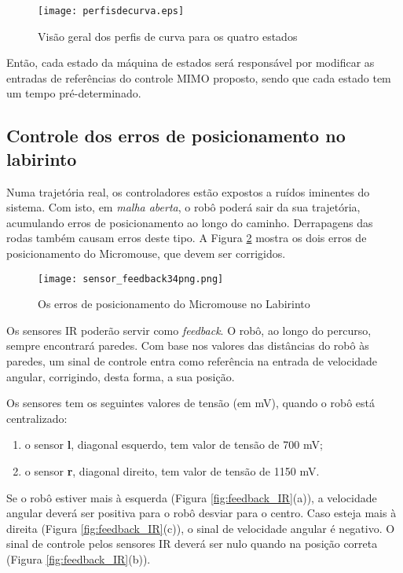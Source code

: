 \begin{figure}[!htb]
	\caption{\label{fig:curvasperfil_4}Visão geral dos perfis de curva para os quatro estados}
	\begin{center}
		\texttt{[image: perfisdecurva.eps]}
	\end{center}
\end{figure} 

Então, cada estado da máquina de estados será responsável por modificar as entradas de referências do controle MIMO proposto, sendo que cada estado tem um tempo pré-determinado. 
\subsection{Controle dos erros de posicionamento no labirinto}
Numa trajetória real, os controladores estão expostos a ruídos iminentes do sistema. Com isto, em \emph{malha aberta}, o robô poderá sair da sua trajetória, acumulando erros de posicionamento ao longo do caminho. Derrapagens das rodas também causam erros deste tipo. A Figura \ref{fig:errosposic} mostra os dois erros de posicionamento do Micromouse, que devem ser corrigidos.

\begin{figure}[!htb]
	\caption{\label{fig:errosposic}Os erros de posicionamento do Micromouse no Labirinto}
	\begin{center}
		\texttt{[image: sensor\_feedback34png.png]}
	\end{center}
\end{figure} 

Os sensores IR poderão servir como \emph{feedback}. O robô, ao longo do percurso, sempre encontrará paredes. Com base nos valores das distâncias do robô às paredes, um sinal de controle entra como referência na entrada de velocidade angular, corrigindo, desta forma, a sua posição.

Os sensores tem os seguintes valores de tensão (em mV), quando o robô está centralizado:
\begin{enumerate}[leftmargin=2cm,label=\alph*)]
\item o sensor \textbf{l}, diagonal esquerdo, tem valor de tensão de 700 mV;
\item o sensor \textbf{r}, diagonal direito, tem valor de tensão de 1150 mV.
\end{enumerate}


Se o robô estiver mais à esquerda (Figura \ref{fig:feedback_IR}(a)), a velocidade angular deverá ser positiva para o robô desviar para o centro. Caso esteja mais à direita  (Figura \ref{fig:feedback_IR}(c)), o sinal de velocidade angular é negativo. O sinal de controle pelos sensores IR deverá ser nulo quando na posição correta (Figura \ref{fig:feedback_IR}(b)).



